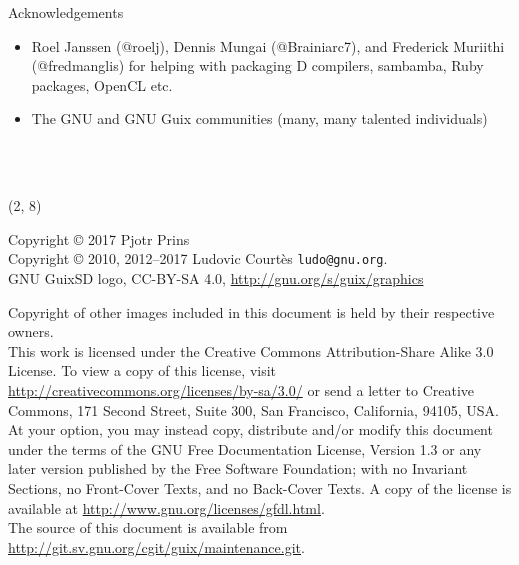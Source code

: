 \documentclass{beamer}
\begin{document}
\begin{frame}{Acknowledgements}
\small
\begin{itemize}
\item Roel Janssen (@roelj), Dennis Mungai (@Brainiarc7), and Frederick Muriithi (@fredmanglis) for helping with packaging D compilers, sambamba, Ruby packages, OpenCL etc.
\item The GNU and GNU Guix communities (many, many talented individuals)
\end{itemize}
\end{frame}

\begin{frame}[plain]

\vfill{
  \vspace{2.5cm}
  \\[1.0cm]
  \\
}
\end{frame}

\begin{frame}{}

  \begin{textblock}{12}(2, 8)
    \tiny{
      Copyright \copyright{} 2017 Pjotr Prins\\
      Copyright \copyright{} 2010, 2012--2017 Ludovic Courtès \texttt{ludo@gnu.org}.\\[3.0mm]
      GNU GuixSD logo, CC-BY-SA 4.0, \url{http://gnu.org/s/guix/graphics}

      Copyright of other images included in this document is held by
      their respective owners.
      \\[3.0mm]
      This work is licensed under the \alert{Creative Commons
        Attribution-Share Alike 3.0} License.  To view a copy of this
      license, visit
      \url{http://creativecommons.org/licenses/by-sa/3.0/} or send a
      letter to Creative Commons, 171 Second Street, Suite 300, San
      Francisco, California, 94105, USA.
      \\[2.0mm]
      At your option, you may instead copy, distribute and/or modify
      this document under the terms of the \alert{GNU Free Documentation
        License, Version 1.3 or any later version} published by the Free
      Software Foundation; with no Invariant Sections, no Front-Cover
      Texts, and no Back-Cover Texts.  A copy of the license is
      available at \url{http://www.gnu.org/licenses/gfdl.html}.
      \\[2.0mm]
      The source of this document is available from
      \url{http://git.sv.gnu.org/cgit/guix/maintenance.git}.
    }
  \end{textblock}
\end{frame}
\end{document}
